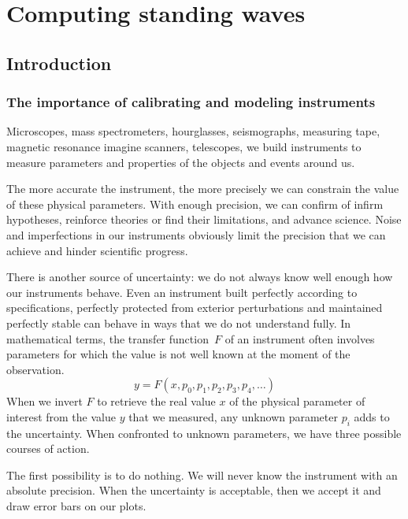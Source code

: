 \cleardoublepage
\chapter{Computing standing waves}
\label{sec:chapter2}

\section{Introduction}
\label{sec:chapter2_0}

\subsection{The importance of calibrating and modeling instruments}

Microscopes, mass spectrometers, hourglasses, seismographs, measuring tape, magnetic resonance imagine scanners, telescopes, 
we build instruments to measure parameters and properties of the objects and events around us.

The more accurate the instrument, the more precisely we can constrain the value of these physical parameters.
With enough precision, we can confirm of infirm hypotheses, reinforce theories or find their limitations, and advance science.
Noise and imperfections in our instruments obviously limit the precision that we can achieve and hinder scientific progress.

There is another source of uncertainty: we do not always know well enough how our instruments behave.
Even an instrument built perfectly according to specifications, perfectly protected from exterior perturbations and maintained perfectly stable can behave in ways that we do not understand fully.
In mathematical terms, the transfer function~$F$ of an instrument often involves parameters for which the value is not well known at the moment of the observation.
\begin{equation}
    y = F(x, p_0, p_1, p_2, p_3, p_4, \dots)
\end{equation}
When we invert $F$ to retrieve the real value $x$ of the physical parameter of interest from the value $y$ that we measured, any unknown parameter $p_i$ adds to the uncertainty.
When confronted to unknown parameters, we have three possible courses of action.

The first possibility is to do nothing.
We will never know the instrument with an absolute precision.
When the uncertainty is acceptable, then we accept it and draw error bars on our plots.

